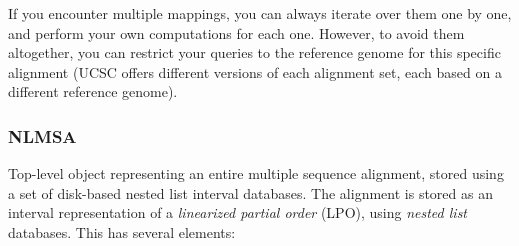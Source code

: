 \documentclass{howto}
\begin{document}
If you encounter multiple mappings, you can always iterate over them one
by one, and perform your own computations for each one.  However, to avoid them
altogether, you can restrict your queries to the reference genome for this specific
alignment (UCSC offers different versions of each alignment set, each based on 
a different reference genome).

\subsubsection{NLMSA}
Top-level object representing an entire multiple sequence alignment, 
stored using a set of disk-based nested list interval databases.
The alignment is stored as an interval representation of a 
{\em linearized partial order} (LPO), using {\em nested list}
databases.  This has several elements:
\end{document}
